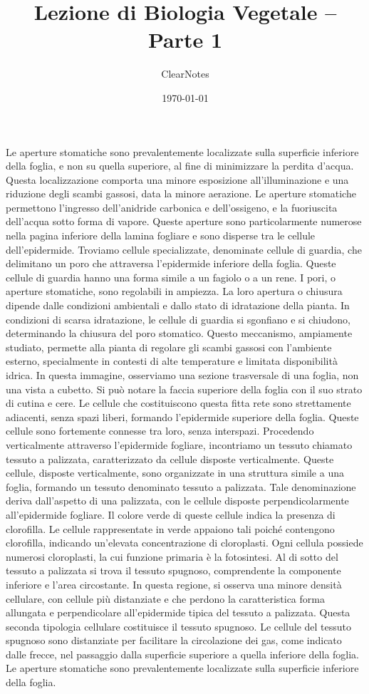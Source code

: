 \documentclass[11pt, a4paper]{article}
\title{Lezione di Biologia Vegetale -- Parte 1}
\author{ClearNotes}
\date{\today}
\begin{document}
\maketitle
\begin{spacing}{1}
Le aperture stomatiche sono prevalentemente localizzate sulla superficie inferiore della foglia, e non su quella superiore, al fine di minimizzare la perdita d'acqua. Questa localizzazione comporta una minore esposizione all'illuminazione e una riduzione degli scambi gassosi, data la minore aerazione. Le aperture stomatiche permettono l'ingresso dell'anidride carbonica e dell'ossigeno, e la fuoriuscita dell'acqua sotto forma di vapore. Queste aperture sono particolarmente numerose nella pagina inferiore della lamina fogliare e sono disperse tra le cellule dell'epidermide. Troviamo cellule specializzate, denominate cellule di guardia, che delimitano un poro che attraversa l'epidermide inferiore della foglia. Queste cellule di guardia hanno una forma simile a un fagiolo o a un rene.
I pori, o aperture stomatiche, sono regolabili in ampiezza. La loro apertura o chiusura dipende dalle condizioni ambientali e dallo stato di idratazione della pianta. In condizioni di scarsa idratazione, le cellule di guardia si sgonfiano e si chiudono, determinando la chiusura del poro stomatico. Questo meccanismo, ampiamente studiato, permette alla pianta di regolare gli scambi gassosi con l'ambiente esterno, specialmente in contesti di alte temperature e limitata disponibilità idrica.
In questa immagine, osserviamo una sezione trasversale di una foglia, non una vista a cubetto. Si può notare la faccia superiore della foglia con il suo strato di cutina e cere. Le cellule che costituiscono questa fitta rete sono strettamente adiacenti, senza spazi liberi, formando l'epidermide superiore della foglia. Queste cellule sono fortemente connesse tra loro, senza interspazi. Procedendo verticalmente attraverso l'epidermide fogliare, incontriamo un tessuto chiamato tessuto a palizzata, caratterizzato da cellule disposte verticalmente.
Queste cellule, disposte verticalmente, sono organizzate in una struttura simile a una foglia, formando un tessuto denominato tessuto a palizzata. Tale denominazione deriva dall'aspetto di una palizzata, con le cellule disposte perpendicolarmente all'epidermide fogliare. Il colore verde di queste cellule indica la presenza di clorofilla.
Le cellule rappresentate in verde appaiono tali poiché contengono clorofilla, indicando un'elevata concentrazione di cloroplasti. Ogni cellula possiede numerosi cloroplasti, la cui funzione primaria è la fotosintesi. Al di sotto del tessuto a palizzata si trova il tessuto spugnoso, comprendente la componente inferiore e l'area circostante. In questa regione, si osserva una minore densità cellulare, con cellule più distanziate e che perdono la caratteristica forma allungata e perpendicolare all'epidermide tipica del tessuto a palizzata. Questa seconda tipologia cellulare costituisce il tessuto spugnoso. Le cellule del tessuto spugnoso sono distanziate per facilitare la circolazione dei gas, come indicato dalle frecce, nel passaggio dalla superficie superiore a quella inferiore della foglia. Le aperture stomatiche sono prevalentemente localizzate sulla superficie inferiore della foglia.

\end{spacing}
\end{document}
